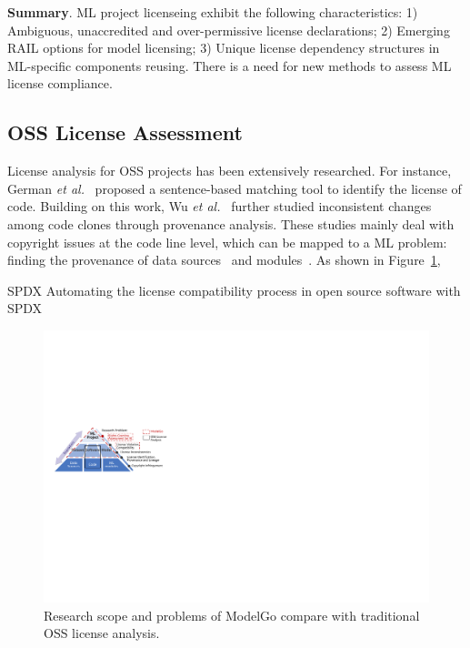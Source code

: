 \begin{tcolorbox}
\textbf{Summary}.
ML project licenseing exhibit the following characteristics:
1) Ambiguous, unaccredited and over-permissive license declarations;
2) Emerging RAIL options for model licensing;
3) Unique license dependency structures in ML-specific components reusing.
There is a need for new methods to assess ML license compliance.
\end{tcolorbox}


\subsection{OSS License Assessment}
License analysis for OSS projects has been extensively researched.
For instance, German \textit{et al.}~\cite{german2010sentence} proposed a sentence-based matching tool to identify the license of code.
Building on this work, Wu \textit{et al.}~\cite{wu2017analysis} further studied inconsistent changes among code clones through provenance analysis.
These studies mainly deal with copyright issues at the code line level, which can be mapped to a ML problem: finding the provenance of data sources~\cite{rajbahadur2021can} and modules~\cite{chen2022copy}.
As shown in Figure~\ref{fig:pyramid}, 


SPDX
Automating the license compatibility process in open source software with SPDX


\begin{figure}[t]
    \centering
    \includegraphics[width=\linewidth]{fig/pyramid.pdf}
    \caption{Research scope and problems of ModelGo compare with traditional OSS license analysis.}
    \Description{}
    \label{fig:pyramid}
\end{figure}


